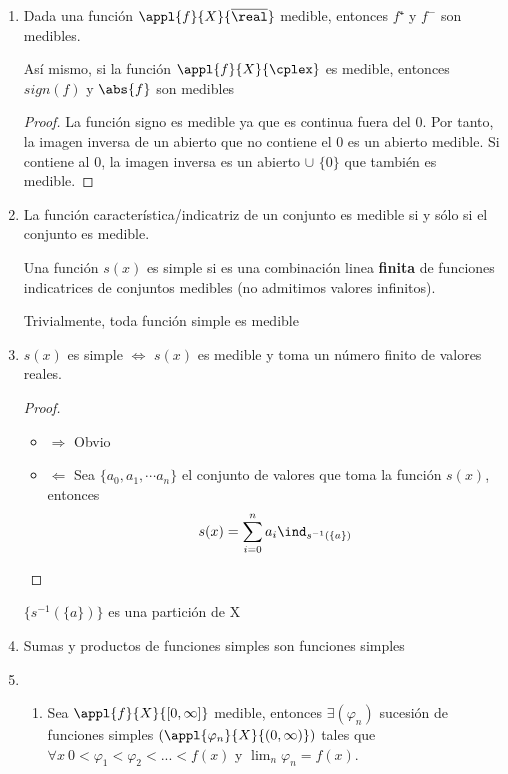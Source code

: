 \documentclass{apuntes}
\begin{document}
\begin{enumerate}
\item Dada una función $\appl{f}{X}{\overline{\real}}$ medible, entonces $f⁺$ y $f^-$ son medibles.

Así mismo, si la función $\appl{f}{X}{\cplex}$ es medible, entonces $sign(f)$ y $\abs{f}$ son medibles

\begin{proof}
La función signo es medible ya que es continua fuera del 0. Por tanto, la imagen inversa de un abierto que no contiene el 0 es un abierto medible. Si contiene al 0, la imagen inversa es un abierto $\cup$ $\{0\}$ que también es medible.
\end{proof}

\item La función característica/indicatriz de un conjunto es medible si y sólo si el conjunto es medible.

\begin{defn}
Una función $s(x)$ es simple si es una combinación linea \textbf{finita} de funciones indicatrices de conjuntos medibles (no admitimos valores infinitos).

Trivialmente, toda función simple es medible
\end{defn}

\item $s(x)$ es simple $\iff$ $s(x)$ es medible y toma un número finito de valores reales.
\begin{proof}
\begin{itemize}
\item $\Rightarrow$ Obvio
\item $\Leftarrow$ Sea $\{a_0, a_1, \cdots a_n\}$ el conjunto de valores que toma la función $s(x)$, entonces
\[s(x)= \sum_{i=0}^{n}a_i \ind_{s^{-1}(\{a\})}\]
\end{itemize}
\end{proof}

\obs $\{s^{-1}(\{a\})\}$ es una partición de X

\newpage
\item Sumas y productos de funciones simples son funciones simples

\item
\begin{enumerate}
\item Sea $\appl{f}{X}{[0,\infty]}$ medible, entonces $\exists (\varphi_n)$ sucesión de funciones simples $(\appl{\varphi_n}{X}{(0, \infty)})$ tales que
$\forall x \ 0 < \varphi_1 < \varphi_2 < ... < f(x)$ y $\lim_n \varphi_n = f(x)$.


\end{enumerate}
\end{enumerate}
\end{document}
